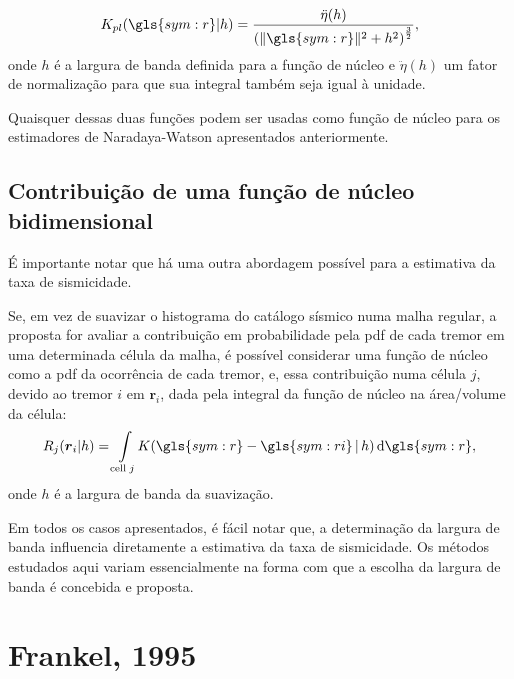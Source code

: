 \begin{equation}
	\ensuremath{
		K_{pl}(\gls{sym:r}\arrowvert h) = 
			\frac{\ddot{\eta}(h)}
 				 {\left( \|\gls{sym:r}\|^2 + h^2 \right)^{\frac{3}{2}} },
 	}
\label{eq:kernel_pl}
\end{equation}
onde $h$ é a largura de banda definida para a função de núcleo e $\ddot{\eta}(h)$ um fator de normalização
para que sua integral também seja igual à unidade.


Quaisquer dessas duas funções podem ser usadas como função de núcleo 
para os estimadores de Naradaya-Watson apresentados anteriormente.

\subsection{Contribuição de uma função de núcleo bidimensional}

É importante notar que há uma outra abordagem possível para a estimativa da taxa de sismicidade.

Se, em vez de suavizar o histograma do catálogo sísmico numa malha regular, a proposta for
avaliar a contribuição em probabilidade pela \gls{pdf} de cada tremor em uma determinada célula da malha, 
é possível considerar uma função de núcleo como a \gls{pdf} da ocorrência de cada tremor, e,
essa contribuição numa célula $j$, devido ao tremor $i$ em $\boldsymbol{r}_i$, dada pela integral da
função de núcleo na área/volume da célula: 
\begin{equation}
	\ensuremath{
		R_{j}(\boldsymbol{r}_i \arrowvert h) = \int\limits_{\mathrm{cell}\;j}\!K( \gls{sym:r} -
		\gls{sym:ri}\,\arrowvert\,h)\,\mathrm{d}\gls{sym:r} },
\label{eq:kernel_int}
\end{equation}
onde $h$ é a largura de banda da suavização.


Em todos os casos apresentados, é fácil notar que, a determinação da largura de banda influencia diretamente
a estimativa da taxa de sismicidade. Os métodos estudados aqui variam essencialmente 
na forma com que a escolha da largura de banda é concebida e proposta.



\section{Frankel, 1995}
\label{sec:frankel}

